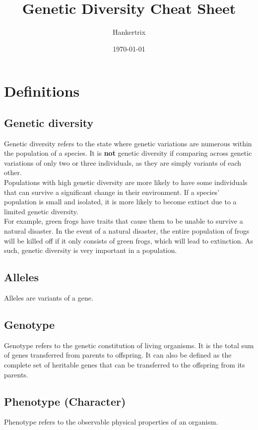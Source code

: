 \documentclass[11pt]{article}
\author{Hankertrix}
\date{\today}
\title{Genetic Diversity Cheat Sheet}
\begin{document}
\maketitle
\setcounter{tocdepth}{2}
\tableofcontents

\newpage

\section{Definitions}
\label{sec:org0c1d8cf}

\subsection{Genetic diversity}
\label{sec:org0c67da8}
Genetic diversity refers to the state where genetic variations are numerous within the population of a species. It is \textbf{not} genetic diversity if comparing across genetic variations of only two or three individuals, as they are simply variants of each other.
\\[0pt]

Populations with high genetic diversity are more likely to have some individuals that can survive a significant change in their environment. If a species' population is small and isolated, it is more likely to become extinct due to a limited genetic diversity.
\\[0pt]

For example, green frogs have traits that cause them to be unable to survive a natural disaster. In the event of a natural disaster, the entire population of frogs will be killed off if it only consists of green frogs, which will lead to extinction. As such, genetic diversity is very important in a population.

\subsection{Alleles}
\label{sec:org6ed9874}
Alleles are variants of a gene.

\subsection{Genotype}
\label{sec:org631b4d4}
Genotype refers to the genetic constitution of living organisms. It is the total sum of genes transferred from parents to offspring. It can also be defined as the complete set of heritable genes that can be transferred to the offspring from its parents.

\subsection{Phenotype (Character)}
\label{sec:orga6615dc}
Phenotype refers to the observable physical properties of an organism.
\end{document}
